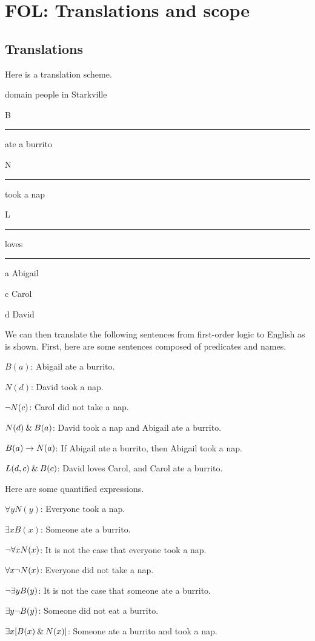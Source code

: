 \graphicspath{{figures--proofs/}}

\chapter{FOL: Translations and scope}\label{FOL-basics}

\section{Translations}

Here is a translation scheme.

\begin{ekey}
	\item[\textrm{domain}] people in Starkville
	\item[B] \rule{1cm}{0.15mm} ate a burrito
	\item[N] \rule{1cm}{0.15mm} took a nap
	\item[L] \rule{1cm}{0.15mm} loves \rule{1cm}{0.15mm}
	\item[a] Abigail
	\item[c] Carol
	\item[d] David
\end{ekey}

\noindent We can then translate the following sentences from first-order logic to English as is shown. First, here are some sentences composed of predicates and names.

\begin{ebullet}
	\item[]$B(a) $: Abigail ate a burrito.\smallskip
	\item[]$N(d) $: David took a nap.\smallskip
	\item[]${\neg} N(c)$: Carol did not take a nap.\smallskip
	\item[]$N(d) \mathbin{\&} B(a) $: David took a nap and Abigail ate a burrito.\smallskip
	\item[]$B(a) \rightarrow N(a)$: If Abigail ate a burrito, then Abigail took a nap.\smallskip
	\item[]$L(d,c) \mathbin{\&} B(c)$: David loves Carol, and Carol ate a burrito.
\end{ebullet}

\noindent Here are some quantified expressions.

\begin{ebullet}
	\item[] $\forall y N(y)$: Everyone took a nap.\smallskip
	\item[] $\exists x B(x)$: Someone ate a burrito.\smallskip
	\item[] ${\neg}\forall xN(x)$: It is not the case that everyone took a nap.\smallskip
	\item[]$\forall x {\neg} N(x)$: Everyone did not take a nap.\smallskip
	\item[]${\neg}\exists yB(y)$: It is not the case that someone ate a burrito.\smallskip
	\item[]$\exists y {\neg} B(y)$: Someone did not eat a burrito.\smallskip
	\item[]$\exists x[B(x) \mathbin{\&} N(x)]$: Someone ate a burrito and took a nap.\smallskip
\end{ebullet}
	
